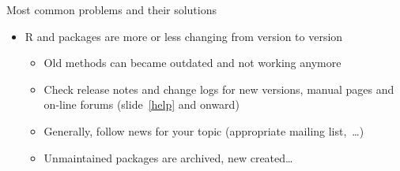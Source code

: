 \documentclass[compress, xelatex, 11pt, xcolor=svgnames, aspectratio=169, url={hyphens, lowtilde}]{beamer}
\begin{document}
\begin{frame}[allowframebreaks]{Most common problems and their solutions}
\begin{itemize}
		\begin{itemize}
			\item Check manual and/or some on-line forum (slide~\ref{help} and onward)
		\end{itemize}
		\item R and packages are more or less changing from version to version
		\begin{itemize}
			\item Old methods can became outdated and not working anymore
			\item Check release notes and change logs for new versions, manual pages and on-line forums (slide~\ref{help} and onward)
			\item Generally, follow news for your topic (appropriate mailing list,~\ldots)
			\item Unmaintained packages are archived, new created\ldots
		\end{itemize}
	\end{itemize}
\end{frame}
\end{document}
